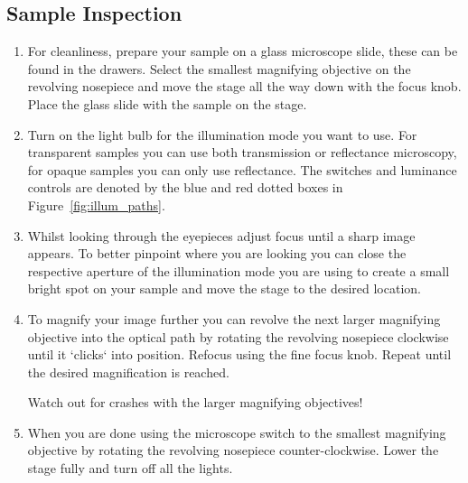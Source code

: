 \documentclass[a4paper]{scrartcl}
\begin{document}
\subsection*{Sample Inspection}
\begin{enumerate}
	\item For cleanliness, prepare your sample on a glass microscope slide, these can be found in the drawers. Select the smallest magnifying objective on the revolving nosepiece and move the stage all the way down with the focus knob.\\
	      Place the glass slide with the sample on the stage.
	\item Turn on the light bulb for the illumination mode you want to use. For transparent samples you can use both transmission or reflectance microscopy, for opaque samples you can only use reflectance. The switches and luminance controls are denoted by the blue and red dotted boxes in Figure~\ref{fig:illum_paths}.
	\item Whilst looking through the eyepieces adjust focus until a sharp image appears. To better pinpoint where you are looking you can close the respective aperture of the illumination mode you are using to create a small bright spot on your sample and move the stage to the desired location.
	\item To magnify your image further you can revolve the next larger magnifying objective into the optical path by rotating the revolving nosepiece clockwise until it `clicks` into position. Refocus using the fine focus knob. Repeat until the desired magnification is reached.\\
	      \colorbox{warning!30}{\parbox{\linewidth}{Watch out for crashes with the larger magnifying objectives!}}
	\item When you are done using the microscope switch to the smallest magnifying objective by rotating the revolving nosepiece counter-clockwise. Lower the stage fully and turn off all the lights.
\end{enumerate}
\end{document}
